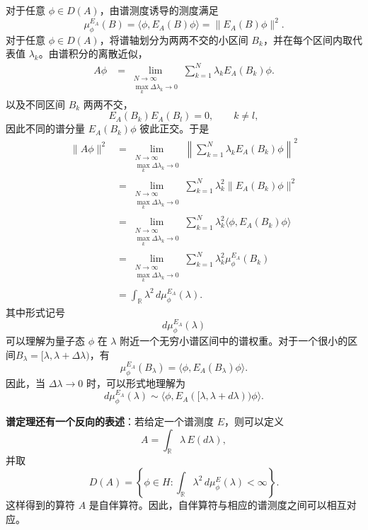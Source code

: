 \documentclass[UTF8,a4paper,11pt,openany]{ctexbook}
\begin{document}
对于任意 $\phi\in D(A)$，由谱测度诱导的测度满足
\[
\mu_\phi^{E_A}(B)
=
\langle\phi,E_A(B)\phi\rangle
=
\|E_A(B)\phi\|^2.
\]
对于任意 $\phi\in D(A)$，将谱轴划分为两两不交的小区间 $B_k$，并在每个区间内取代表值 $\lambda_k$。由谱积分的离散近似，
\begin{align}
    A\phi
    &=
    \lim_{\substack{N\to\infty\\
    \max_k\Delta\lambda_k\to0}}
    \sum_{k=1}^{N}
    \lambda_k E_A(B_k)\phi .
\end{align}
以及不同区间 $B_k$ 两两不交，
\begin{equation}
    E_A(B_k)E_A(B_l)=0,
    \qquad k\neq l,
\end{equation}
因此不同的谱分量 $E_A(B_k)\phi$ 彼此正交。于是
\begin{align}
    \|A\phi\|^2
    &=
    \lim_{\substack{N\to\infty\\
    \max_k\Delta\lambda_k\to0}}
    \left\|
    \sum_{k=1}^{N}
    \lambda_k E_A(B_k)\phi
    \right\|^2
    \nonumber\\
    &=
    \lim_{\substack{N\to\infty\\
    \max_k\Delta\lambda_k\to0}}
    \sum_{k=1}^{N}
    \lambda_k^2
    \|E_A(B_k)\phi\|^2
    \nonumber\\
    &=
    \lim_{\substack{N\to\infty\\
    \max_k\Delta\lambda_k\to0}}
    \sum_{k=1}^{N}
    \lambda_k^2
    \langle\phi,E_A(B_k)\phi\rangle
    \nonumber\\
    &=
    \lim_{\substack{N\to\infty\\
    \max_k\Delta\lambda_k\to0}}
    \sum_{k=1}^{N}
    \lambda_k^2
    \mu_\phi^{E_A}(B_k)
    \nonumber\\
    &=
    \int_{\mathbb R}
    \lambda^2\,d\mu_\phi^{E_A}(\lambda).
\end{align}
其中形式记号
\[
d\mu_\phi^{E_A}(\lambda)
\]
可以理解为量子态 $\phi$ 在 $\lambda$ 附近一个无穷小谱区间中的谱权重。对于一个很小的区间$B_\lambda=[\lambda,\lambda+\Delta\lambda)$，有
\begin{equation}
    \mu_\phi^{E_A}(B_\lambda)
    =
    \langle\phi,E_A(B_\lambda)\phi\rangle.
\end{equation}
因此，当 $\Delta\lambda\to0$ 时，可以形式地理解为
\begin{equation}
    d\mu_\phi^{E_A}(\lambda)
    \sim
    \langle
    \phi,
    E_A([\lambda,\lambda+d\lambda))
    \phi
    \rangle.
\end{equation}

\textbf{谱定理还有一个反向的表述}：若给定一个谱测度 $E$，则可以定义
\[
A
=
\int_{\mathbb R}
\lambda\,E(d\lambda),
\]
并取
\[
D(A)
=
\left\{
\phi\in H:
\int_{\mathbb R}
\lambda^2\,d\mu_\phi^E(\lambda)<\infty
\right\}.
\]
这样得到的算符 $A$ 是自伴算符。因此，自伴算符与相应的谱测度之间可以相互对应。
\end{document}
